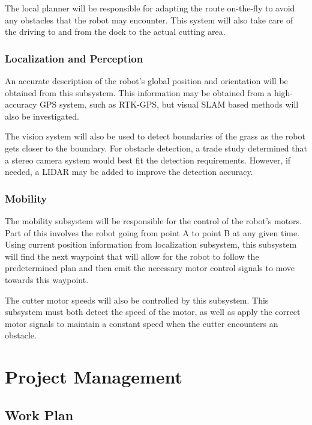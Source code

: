 \documentclass{article}
\begin{document}
			The local planner will be responsible for adapting the route on-the-fly to avoid any obstacles that the robot may encounter. This system will also take care of the driving to and from the dock to the actual cutting area. 
			
		\subsubsection{Localization and Perception}
			An accurate description of the robot's global position and orientation will be obtained from this subsystem. This information may be obtained from a high-accuracy GPS system, such as RTK-GPS, but visual SLAM based methods will also be investigated. 
			
			The vision system will also be used to detect boundaries of the grass as the robot gets closer to the boundary. For obstacle detection, a trade study determined that a stereo camera system would best fit the detection requirements. However, if needed, a LIDAR may be added to improve the detection accuracy. 
		
		\subsubsection{Mobility}
			The mobility subsystem will be responsible for the control of the robot's motors. Part of this involves the robot going from point A to point B at any given time. Using current position information from localization subsystem, this subsystem will find the next waypoint that will allow for the robot to follow the predetermined plan and then emit the necessary motor control signals to move towards this waypoint. 
			
			The cutter motor speeds will also be controlled by this subsystem. This subsystem must both detect the speed of the motor, as well as apply the correct motor signals to maintain a constant speed when the cutter encounters an obstacle. 


\section{Project Management}
\subsection{Work Plan}
\end{document}

